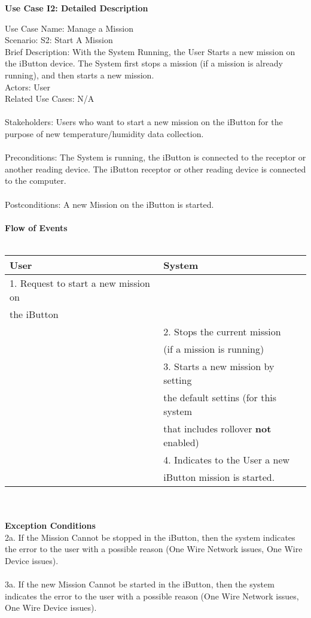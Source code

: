 \documentclass[letterpaper]{article}
\begin{document}
\noindent
\begin{center}
\textbf{Use Case I2:  Detailed Description}
\end{center}
Use Case Name:  Manage a Mission\\
Scenario:  S2:  Start A Mission\\
Brief Description:  With the System Running, the User Starts a new
mission on the iButton device.  The System first stops a mission (if
a mission is already running), and then starts a new mission.\\
Actors:  User\\
Related Use Cases: N/A\\\\
Stakeholders:  Users who want to start a new mission on the iButton
for the purpose of new temperature/humidity data collection.\\\\
Preconditions:  The System is running, the iButton is connected to
the receptor or another reading device.  The iButton receptor or
other reading device is connected to the computer.\\\\
Postconditions:  A new Mission on the iButton is started.\\\\
\textbf{Flow of Events}\\\\
\begin{tabular}{|l|l|}\hline
\textbf{User} & \textbf{System}\\\hline
1.  Request to start a new mission on & \\
the iButton& \\\hline
& 2.  Stops the current mission\\
& (if a mission is running)\\\hline
& 3.  Starts a new mission by setting\\
& the default settins (for this system\\
& that includes rollover \textbf{not} enabled)\\\hline
& 4.  Indicates to the User a new \\
& iButton mission is started.\\\hline
\end{tabular}\\\\
\textbf{Exception Conditions}\\
2a.  If the Mission Cannot be stopped in the iButton, then the
system indicates the error to the user with a possible reason
(One Wire Network issues, One Wire Device issues).\\\\
3a.  If the new Mission Cannot be started in the iButton, then the
system indicates the error to the user with a possible reason
(One Wire Network issues, One Wire Device issues).
\end{document}
